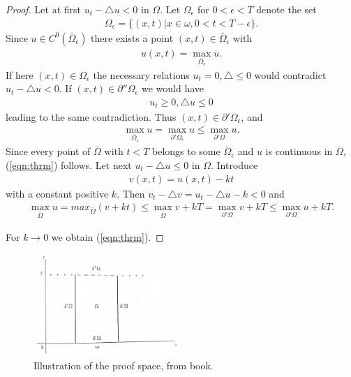 \documentclass[11pt]{article}
\begin{document}
\begin{proof}
Let at first $u_t-\triangle u < 0$ in $\Omega$.  Let $\Omega_{\epsilon}$ for $0<\epsilon<T$ denote the set
\begin{align*}
\Omega_{\epsilon} = \{(x,t)|x\in \omega, 0<t<T-\epsilon\}.
\end{align*}
Since $u \in C^0(\bar{\Omega}_{\epsilon})$ there exists a point $(x,t) \in \bar{\Omega}_{\epsilon}$ with
\begin{align*}
u(x,t) = \max_{ \bar{\Omega}_{\epsilon} } u.
\end{align*}
If here $(x,t) \in \Omega_{\epsilon}$ the necessary relations $u_t = 0, \triangle \le 0$ would contradict $u_t - \triangle u < 0$.  If $(x,t) \in \partial '' \Omega_{\epsilon}$ we would have
\begin{align*}
u_t \ge 0, \triangle u \le 0
\end{align*}
leading to the same contradiction.  Thus $(x,t) \in \partial ' \Omega_{\epsilon}$, and
\begin{align*}
\max_{ \bar{\Omega}_{\epsilon} } u = \max_{ \partial ' \Omega_{\epsilon} } u \le \max_{ \partial ' \Omega } u.
\end{align*}
Since every point of $\bar{\Omega}$ with $t<T$ belongs to some $\bar{\Omega}_{\epsilon}$ and $u$ is continuous in $\bar{\Omega}$, (\ref{eqn:thrm}) follows. Let next $u_t - \triangle u \le 0$ in $\Omega$. Introduce
\begin{align*}
v(x,t) = u(x,t) - kt
\end{align*}
with a constant positive $k$.  Then $v_t-\triangle v = u_t-\triangle u - k < 0$ and
\begin{align*}
\max_{\bar{\Omega}} u = max_{ \bar{\Omega} } (v+kt) \le \max_{\bar{\Omega}} v + kT = \max_{\partial ' \Omega} v + kT \le \max_{\partial ' \Omega} u + kT.
\end{align*}

For $k \rightarrow 0$ we obtain (\ref{eqn:thrm}).


\end{proof}

\begin{center}
\begin{figure}
\centering
\includegraphics[width=0.5\textwidth]{drawing}
\caption{Illustration of the proof space, from book.}
\label{fig:drawing}
\end{figure}
\end{center}
\end{document}
